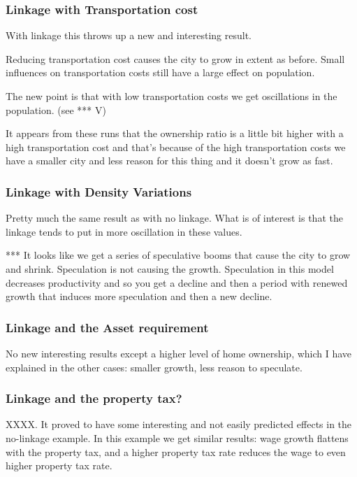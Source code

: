 \documentclass[]{article}
\begin{document}
\subsubsection{Linkage with Transportation cost}

With linkage this throws up a new and interesting result.

Reducing transportation cost causes the city to grow in extent as before. Small influences on transportation costs still have a large effect on population.

The new point is that with low transportation costs we get oscillations in the population. (see *** V)

It appears from these runs that the ownership ratio is a little bit higher with a high transportation cost and that’s because of the high transportation costs we have a smaller city and less reason for this thing and it doesn’t grow as fast.

\subsubsection{Linkage with Density Variations}

Pretty much the same result as with no linkage. What is of interest is that the linkage tends to put in more oscillation in these values.

*** It looks like we get a series of speculative booms that cause the city to grow and shrink. Speculation is not causing the growth. Speculation in this model decreases productivity and so you get a decline and then a period with renewed growth that induces more speculation and then a new decline.

\subsubsection{Linkage and the Asset requirement}

No new interesting results except a higher level of home ownership, which I have explained in the other cases: smaller growth, less reason to speculate.

\subsubsection{Linkage and the property tax?}

XXXX. It proved to have some interesting and not easily predicted effects in the no-linkage example. In this example we get similar results:  wage growth flattens with the property tax, and a higher property tax rate reduces the wage to even higher property tax rate.
\end{document}
